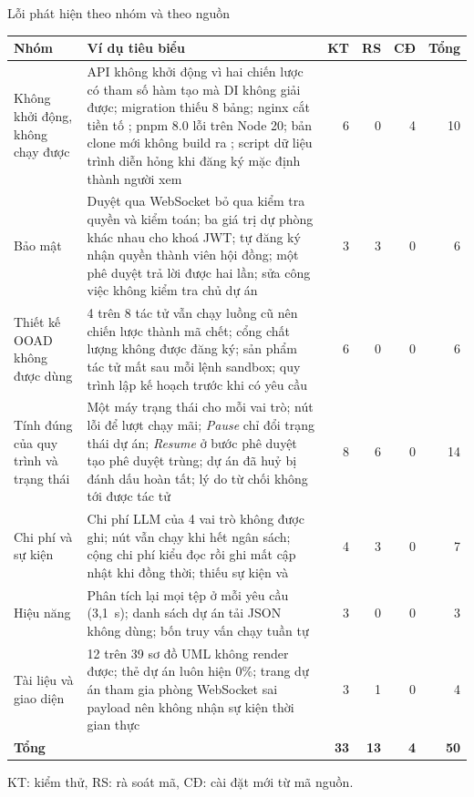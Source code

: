 \begin{table}{Lỗi phát hiện theo nhóm và theo nguồn}
\label{tab:loi}
\small
\begin{tabularx}{\textwidth}{|P{2.8cm}|L|r|r|r|r|}
\hline
\textbf{Nhóm} & \textbf{Ví dụ tiêu biểu} & \textbf{KT} & \textbf{RS} & \textbf{CĐ} & \textbf{Tổng} \\ \hline
Không khởi động, không chạy được & API không khởi động vì hai chiến lược có tham số hàm tạo mà DI không giải được; migration thiếu 8 bảng; nginx cắt tiền tố ; pnpm 8.0 lỗi trên Node 20; bản clone mới không build ra ; script dữ liệu trình diễn hỏng khi đăng ký mặc định thành người xem & 6 & 0 & 4 & 10 \\ \hline
Bảo mật & Duyệt qua WebSocket bỏ qua kiểm tra quyền và kiểm toán; ba giá trị dự phòng khác nhau cho khoá JWT; tự đăng ký nhận quyền thành viên hội đồng; một phê duyệt trả lời được hai lần; sửa công việc không kiểm tra chủ dự án & 3 & 3 & 0 & 6 \\ \hline
Thiết kế OOAD không được dùng & 4 trên 8 tác tử vẫn chạy luồng cũ nên chiến lược thành mã chết; cổng chất lượng không được đăng ký; sản phẩm tác tử mất sau mỗi lệnh sandbox; quy trình lập kế hoạch trước khi có yêu cầu & 6 & 0 & 0 & 6 \\ \hline
Tính đúng của quy trình và trạng thái & Một máy trạng thái cho mỗi vai trò; nút lỗi để lượt chạy  mãi; \textit{Pause} chỉ đổi trạng thái dự án; \textit{Resume} ở bước phê duyệt tạo phê duyệt trùng; dự án đã huỷ bị đánh dấu hoàn tất; lý do từ chối không tới được tác tử & 8 & 6 & 0 & 14 \\ \hline
Chi phí và sự kiện & Chi phí LLM của 4 vai trò không được ghi; nút vẫn chạy khi hết ngân sách; cộng chi phí kiểu đọc rồi ghi mất cập nhật khi đồng thời; thiếu sự kiện  và  & 4 & 3 & 0 & 7 \\ \hline
Hiệu năng & Phân tích lại mọi tệp ở mỗi yêu cầu (3,1~s); danh sách dự án tải JSON không dùng; bốn truy vấn chạy tuần tự & 3 & 0 & 0 & 3 \\ \hline
Tài liệu và giao diện & 12 trên 39 sơ đồ UML không render được; thẻ dự án luôn hiện 0\%; trang dự án tham gia phòng WebSocket sai payload nên không nhận sự kiện thời gian thực & 3 & 1 & 0 & 4 \\ \hline
\textbf{Tổng} & & \textbf{33} & \textbf{13} & \textbf{4} & \textbf{50} \\ \hline
\end{tabularx}

\vspace{0.2cm}
{\footnotesize KT: kiểm thử, RS: rà soát mã, CĐ: cài đặt mới từ mã nguồn.}
\end{table}

